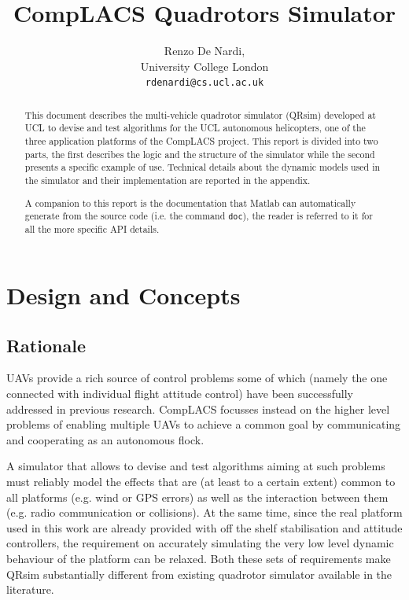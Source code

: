 \documentclass[a4paper,11pt]{report}
\title{{CompLACS} Quadrotors Simulator}
\author{Renzo De Nardi,\\University College London\\\texttt{rdenardi@cs.ucl.ac.uk}}
\newcommand{\sname}{QRsim\xspace}
\begin{document}
\maketitle

\begin{abstract}
This document describes the multi-vehicle quadrotor simulator (\sname) developed at UCL to devise and test algorithms for the UCL autonomous helicopters, one of the three application platforms of the {CompLACS} project.
This report is divided into two parts, the first describes the logic and the structure of the simulator while the second presents a specific example of use. 
Technical details about the dynamic models used in the simulator and their implementation are reported in the appendix. 

A companion to this report is the documentation that Matlab can automatically generate from the source code (i.e. the command \texttt{doc}), the reader is referred to it for all the more specific API details.
\end{abstract}

\tableofcontents

\chapter{Design and Concepts}

\section{Rationale}\label{sec:rationale}
UAVs provide a rich source of control problems some of which (namely the one connected with individual flight attitude control) have been successfully addressed in previous research. {CompLACS} focusses instead on the higher level problems of enabling multiple UAVs to achieve a common goal by communicating and cooperating as an autonomous flock. 

A simulator that allows to devise and test algorithms aiming at such problems must reliably model the effects that are (at least to a certain extent) common to all platforms (e.g. wind or GPS errors) as well as the interaction between them (e.g. radio communication or collisions). 
At the same time, since the real platform used in this work are already provided with off the shelf stabilisation and attitude controllers, the requirement on accurately simulating the very low level dynamic behaviour of the platform can be relaxed.
Both these sets of requirements make \sname substantially different from existing quadrotor simulator available in the literature. 
\end{document}

